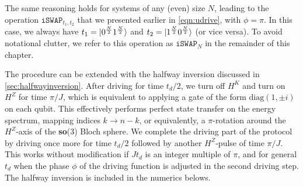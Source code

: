 The same reasoning holds for systems of any (even) size $N$, leading to the operation $\texttt{iSWAP}_{t_1, t_2}$ that we presented earlier in \cref{eqn:udrive}, with $\phi = \pi$. In this case, we always have $t_1 = \lvert0^\frac{N}{2} 1^\frac{N}{2}\rangle$ and $t_2 = \lvert1^\frac{N}{2} 0^\frac{N}{2}\rangle$ (or vice versa). To avoid notational clutter, we refer to this operation as $\texttt{iSWAP}_N$ in the remainder of this chapter.


The procedure can be extended with the halfway inversion discussed in \cref{sec:halfwayinversion}. After driving for time $t_d/2$, we turn off $H^K$ and turn on $H^Z$ for time  $\pi/J$, which is equivalent to applying a gate of the form $\text{diag}(1,\pm i)$ on each qubit. This effectively performs perfect state transfer on the energy spectrum, mapping indices $k \rightarrow n-k$, or equivalently, a $\pi$-rotation around the $H^Z$-axis of the \textbf{so}(3) Bloch sphere. We complete the driving part of the protocol by driving once more for time $t_d/2$ followed by another $H^Z$-pulse of time $\pi/J$. This works without modification if $J t_d$ is an integer multiple of $\pi$, and for general $t_d$ when the phase $\phi$ of the driving function is adjusted in the second driving step. The halfway inversion is included in the numerics belows.


